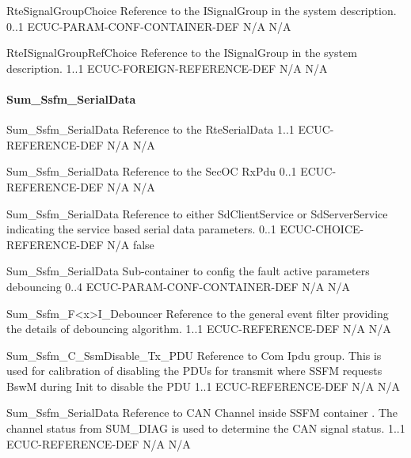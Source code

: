 {RteSignalGroupChoice}
{Reference to the ISignalGroup in the system description.}
{0..1}
{ECUC-PARAM-CONF-CONTAINER-DEF}
{N/A}
{N/A}


{RteISignalGroupRefChoice}
{Reference to the ISignalGroup in the system description.}
{1..1}
{ECUC-FOREIGN-REFERENCE-DEF}
{N/A}
{N/A}

\paragraph{Sum_Ssfm_SerialData}

{Sum_Ssfm_SerialData}
{Reference to the RteSerialData}
{1..1}
{ECUC-REFERENCE-DEF}
{N/A}
{N/A}

{Sum_Ssfm_SerialData}
{Reference to the SecOC RxPdu}
{0..1}
{ECUC-REFERENCE-DEF}
{N/A}
{N/A}

{Sum_Ssfm_SerialData}
{Reference to either SdClientService or SdServerService indicating the service based serial data parameters.}
{0..1}
{ECUC-CHOICE-REFERENCE-DEF}
{N/A}
{false}

{Sum_Ssfm_SerialData}
{Sub-container to config the fault active parameters debouncing}
{0..4}
{ECUC-PARAM-CONF-CONTAINER-DEF}
{N/A}
{N/A}

{Sum_Ssfm_F<x>I_Debouncer}
{Reference to the general event filter providing the details of debouncing algorithm.}
{1..1}
{ECUC-REFERENCE-DEF}
{N/A}
{N/A}


{Sum_Ssfm_C_SsmDisable_Tx_PDU}
{Reference to Com Ipdu group. This is used for calibration of disabling the PDUs for transmit where SSFM requests BswM during Init to disable the PDU}
{1..1}
{ECUC-REFERENCE-DEF}
{N/A}
{N/A}

{   }


{Sum_Ssfm_SerialData}
{Reference to CAN Channel inside SSFM container . The channel status from SUM_DIAG is used to determine the CAN signal status.}
{1..1}
{ECUC-REFERENCE-DEF}
{N/A}
{N/A}


